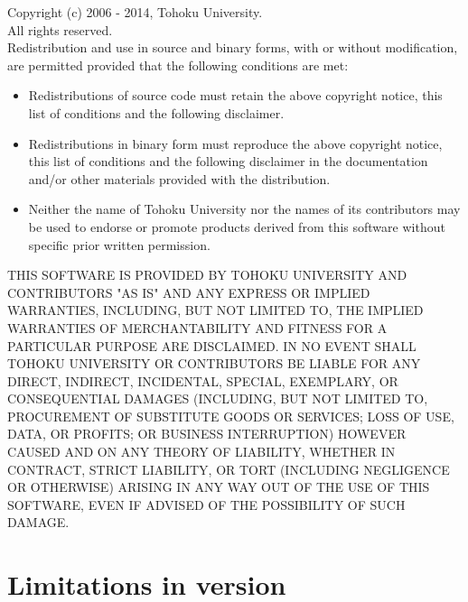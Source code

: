 Copyright (c) 2006 - 2014, Tohoku University.\\
All rights reserved.\\

Redistribution and use in source and binary forms, with or without
modification, are permitted provided that the following conditions are
met:

\begin{itemize}
\item 
  Redistributions of source code must retain the above copyright
  notice, this list of conditions and the following disclaimer. 
\item 
  Redistributions in binary form must reproduce the above
  copyright notice, this list of conditions and the following disclaimer
  in the documentation and/or other materials provided with the
  distribution. 
\item 
  Neither the name of Tohoku University nor the names of its
  contributors may be used to endorse or promote products derived from
  this software without specific prior written permission.  
\end{itemize}

THIS SOFTWARE IS PROVIDED BY TOHOKU UNIVERSITY AND CONTRIBUTORS "AS IS"
AND ANY EXPRESS OR IMPLIED WARRANTIES, INCLUDING, BUT NOT LIMITED TO,
THE IMPLIED WARRANTIES OF MERCHANTABILITY AND FITNESS FOR A PARTICULAR
PURPOSE ARE DISCLAIMED. IN NO EVENT SHALL TOHOKU UNIVERSITY OR
CONTRIBUTORS BE LIABLE FOR ANY DIRECT, INDIRECT, INCIDENTAL, SPECIAL,
EXEMPLARY, OR CONSEQUENTIAL DAMAGES (INCLUDING, BUT NOT LIMITED TO,
PROCUREMENT OF SUBSTITUTE GOODS OR SERVICES; LOSS OF USE, DATA, OR
PROFITS; OR BUSINESS INTERRUPTION) HOWEVER CAUSED AND ON ANY THEORY OF
LIABILITY, WHETHER IN CONTRACT, STRICT LIABILITY, OR TORT (INCLUDING
NEGLIGENCE OR OTHERWISE) ARISING IN ANY WAY OUT OF THE USE OF THIS
SOFTWARE, EVEN IF ADVISED OF THE POSSIBILITY OF SUCH DAMAGE.

\section{
{Limitations in \smlsharp{} version \version{}}
}
\label{sec:smlsharpLimitation}

